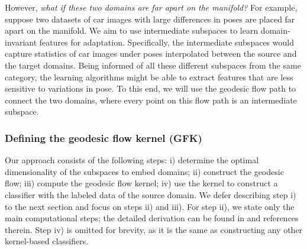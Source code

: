 However, \emph{what if these two domains are far apart on the manifold?} For example, suppose two datasets of car images with large differences in poses are placed far apart on the manifold.
We aim to use intermediate subspaces to learn domain-invariant features for adaptation.
Specifically, the intermediate subspaces would capture statistics of car images under poses interpolated between the source and the target domains. Being informed of all these different subspaces from the same category, the learning algorithms might be able to extract features that are less sensitive to variations in pose.
To this end, we will use the geodesic flow path to connect the two domains, where every point on this flow path is an intermediate subspace.


\subsubsection{Defining the geodesic flow kernel (GFK)}
\label{sGFK-detail}
Our approach consists of the following steps: i) determine the optimal dimensionality of the subspaces to embed domains; ii) construct the geodesic flow; iii) compute the geodesic flow kernel; iv) use the kernel to construct a classifier with the labeled data of the source domain. We defer describing step i) to the next section and focus on steps ii) and iii). For step ii), we state only the main computational steps; the detailed derivation can be found in \cite{gopalan2011domain} and references therein. Step iv) is omitted for brevity, as it is the same as constructing any other kernel-based classifiers.

